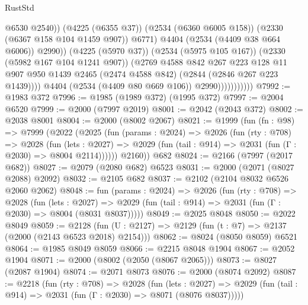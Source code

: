 \begin{lexlean}{RustStd}
\begin{coremodule}
                                      @6530
                                      @2540))
                                  (@4225 (@6355 @37))
                                  (@2534 (@6360 @6005 @158))
                                  (@2330 (@6367 @158 @104 @1459 @907))
                                  @6771)
                                @4404
                                (@2534 (@4409 @38 @664 @6006))
                                @2990))
                            (@4225 (@5970 @37))
                            (@2534 (@5975 @105 @167))
                            (@2330 (@5982 @167 @104 @1241 @907))
                            (@2769
                              @4588
                              @842
                              @267
                              @223
                              @128
                              @11
                              @907
                              @950
                              @1439
                              @2465
                              (@2474 @4588 @842)
                              (@2844 (@2846 @267 @223 @1439))))
                          @4404
                          (@2534 (@4409 @80 @669 @106))
                          @2990)))))))))))
@7992 := @1983 @372
@7996 := @1985 (@1989 @372) (@1995 @372)
@7997 := @2004 @6520
@7999 := @2000 (@7997 @2019)
@8001 := @2042 (@2043 @372)
@8002 := @2038 @8001
@8004 := @2000 (@8002 @2067)
@8021 := @1999
    (fun (fn : @98) =>
    @7999
      (@2022
        (@2025
          (fun (params : @2024) =>
          @2026
            (fun (rty : @708) =>
            @2028
              (fun (lets : @2027) =>
              @2029 (fun (tail : @914) => @2031 (fun (Γ : @2030) => @8004 @2114))))))
        @2160))
    @682
@8024 := @2166 (@7997 (@2017 @682))
@8027 := @2079 (@2080 @682) @6523
@8031 := @2000 (@2071 (@8027 @2088) @2092)
@8032 := @2105 @682
@8037 := @2102 (@2104 @8032 @6526 @2060 @2062)
@8048 := fun (params : @2024) =>
  @2026
    (fun (rty : @708) =>
    @2028
      (fun (lets : @2027) =>
      @2029 (fun (tail : @914) => @2031 (fun (Γ : @2030) => @8004 (@8031 @8037)))))
@8049 := @2025 @8048
@8050 := @2022 @8049
@8059 := @2128 (fun (U : @2127) => @2129 (fun (t : @7) => @2137 (@2000 (@2143 @6523 @2018) @2154)))
@8062 := @8024 (@8050 @8059) @6521
@8064 := @1985 @8049 @8059
@8066 := @2215 @8048 @1904
@8067 := @2052 @1904
@8071 := @2000 (@8002 (@2050 (@8067 @2065)))
@8073 := @8027 (@2087 @1904)
@8074 := @2071 @8073
@8076 := @2000 (@8074 @2092)
@8087 := @2218
    (fun (rty : @708) =>
    @2028
      (fun (lets : @2027) =>
      @2029 (fun (tail : @914) => @2031 (fun (Γ : @2030) => @8071 (@8076 @8037)))))

\end{coremodule}
\end{lexlean}
